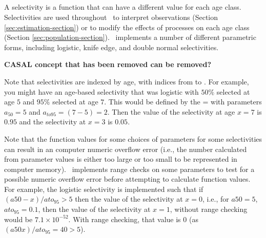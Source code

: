 \subsection{\label{sec:weightless-model}}

\subsection{\label{sec:maturity-notinpartition}}

\newpage

\subsection{\label{sec:selectivities}}

A selectivity is a function that can have a different value for each age class. Selectivities are used throughout \CAS\ to interpret observations (Section \ref{sec:estimation-section}) or to modify the effects of processes on each age class (Section \ref{sec:population-section}). \CAS\ implements a number of different parametric forms, including logistic, knife edge, and double normal selectivities.

\textbf{CASAL concept that has been removed can be removed?}



Note that selectivities are indexed by age, with indices from  to . For example, you might have an age-based selectivity that was logistic with $50\%$ selected at age $5$ and $95\%$ selected at age $7$. This would be defined by the = with parameters $a_{50}=5$ and $a_{to95}=(7-5)=2$. Then the value of the selectivity at age $x=7$ is $0.95$ and the selectivity at $x=3$ is $0.05$.

Note that the function values for some choices of parameters for some selectivities can result in an computer numeric overflow error (i.e., the number calculated from parameter values is either too large or too small to be represented in computer memory). \CAS\ implements range checks on some parameters to test for a possible numeric overflow error before attempting to calculate function values. For example, the logistic selectivity is implemented such that if $(a50-x)/ato_95 > 5$ then the value of the selectivity at $x=0$, i.e., for $a50=5$, $ato_95=0.1$, then the value of the selectivity at $x=1$, without range checking would be $7.1 \times 10^{-52}$. With range checking, that value is $0$ (as $(a50 x)/ato_95=40 > 5$).

